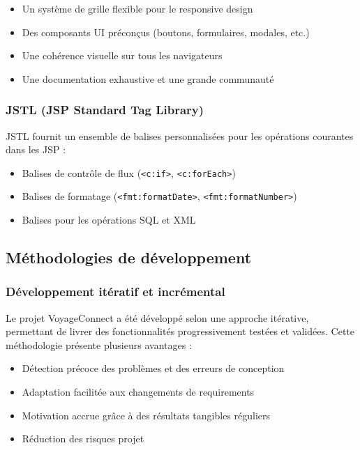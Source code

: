 \documentclass[12pt,a4paper]{report}
\begin{document}
\begin{itemize}
    \item Un système de grille flexible pour le responsive design
    \item Des composants UI préconçus (boutons, formulaires, modales, etc.)
    \item Une cohérence visuelle sur tous les navigateurs
    \item Une documentation exhaustive et une grande communauté
\end{itemize}

\subsubsection{JSTL (JSP Standard Tag Library)}

JSTL fournit un ensemble de balises personnalisées pour les opérations courantes dans les JSP :

\begin{itemize}
    \item Balises de contrôle de flux (\texttt{<c:if>}, \texttt{<c:forEach>})
    \item Balises de formatage (\texttt{<fmt:formatDate>}, \texttt{<fmt:formatNumber>})
    \item Balises pour les opérations SQL et XML
\end{itemize}

\subsection{Méthodologies de développement}

\subsubsection{Développement itératif et incrémental}

Le projet VoyageConnect a été développé selon une approche itérative, permettant de livrer des fonctionnalités progressivement testées et validées. Cette méthodologie présente plusieurs avantages :

\begin{itemize}
    \item Détection précoce des problèmes et des erreurs de conception
    \item Adaptation facilitée aux changements de requirements
    \item Motivation accrue grâce à des résultats tangibles réguliers
    \item Réduction des risques projet
\end{itemize}
\end{document}
